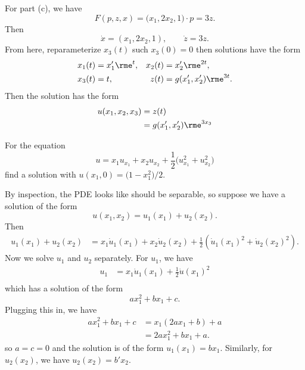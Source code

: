 \begin{solution}
  For part (c), we have
  \[
    F(p,z,x)=\bigl(x_1,2x_2,1\bigr)\cdot p=3z.
  \]
  Then
  \[
    \dot x=(x_1,2x_2,1),\qquad \dot z=3z.
  \]
  From here, reparameterize \(x_3(t)\) such \(x_3(0)=0\) then solutions have
  the form
  \begin{align*}
    x_1(t)&=x_1'\rme^{t},
    &x_2(t)&=x_2'\rme^{2t},\\
    x_3(t)&=t,&
    z(t)&=g(x_1',x_2')\rme^{3t}.
  \end{align*}
  Then the solution has the form
  \begin{align*}
    u(x_1,x_2,x_3)&=z(t)\\
                  &=g(x_1',x_2')\rme^{3x_3}
  \end{align*}
\end{solution}
\newpage

\begin{problem}
  For the equation
  \[
    u=x_1u_{x_1}+x_2u_{x_2}
    +\frac{1}{2}\bigl(u_{x_1}^2+u_{x_2}^2\bigr)
  \]
  find a solution with \(u(x_1,0)=\bigl(1-x_1^2\bigr)/2\).
\end{problem}
\begin{solution}
  By inspection, the PDE looks like should be separable, so suppose we have
  a solution of the form
  \[
    u(x_1,x_2)=u_1(x_1)+u_2(x_2).
  \]
  Then
  \begin{align*}
    u_1(x_1)+u_2(x_2)
    &=x_1\dot u_1(x_1)+x_2\dot u_2(x_2)+\frac{1}{2}\left(\dot
      u_1(x_1)^2+\dot u_2(x_2)^2\right).
  \end{align*}
  Now we solve \(u_1\) and \(u_2\) separately. For \(u_1\), we have
  \begin{align*}
    u_1&=x_1\dot u_1(x_1)+\frac{1}{2}\dot u(x_1)^2\\
  \end{align*}
  which has a solution of the form
  \[
    ax_1^2+bx_1+c.
  \]
  Plugging this in, we have
  \begin{align*}
    ax_1^2+bx_1+c&=x_1(2ax_1+b)+a\\
                 &=2ax_1^2+bx_1+a.
  \end{align*}
  so \(a=c=0\) and the solution is of the form
  \(u_1(x_1)=bx_1\). Similarly, for \(u_2(x_2)\), we have
  \(u_2(x_2)=b'x_2\).
\end{solution}

